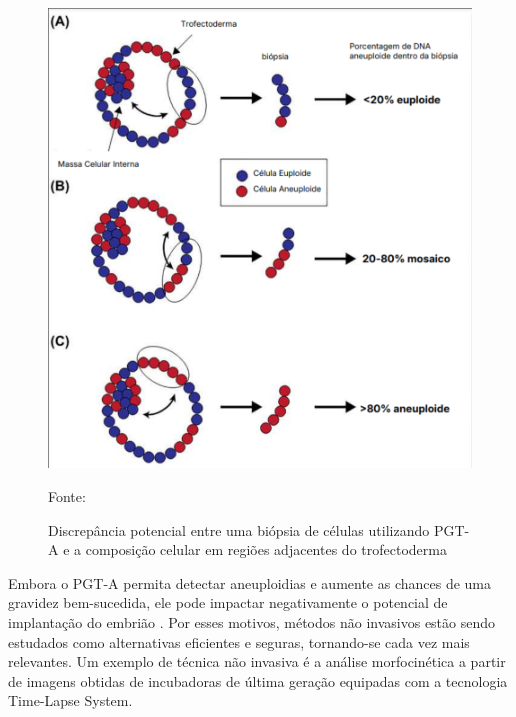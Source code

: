 \begin{figure}[h]
    \captionsetup{font=footnotesize, justification=centering, labelsep=period, position=above}
    \caption{Discrepância potencial entre uma biópsia de células utilizando PGT-A e a composição celular em regiões adjacentes do trofectoderma}
    \label{fig:biopsiaPGT-A}
    \centering
    \includegraphics[scale=0.5]{figuras/biopsiaPGT-A.pdf}
    \vspace{0.3cm} 
    \begin{minipage}{\linewidth}
        \centering
        \scriptsize{Fonte: \cite{gleicher2021}}
    \end{minipage}
\end{figure}
\FloatBarrier

Embora o PGT-A permita detectar aneuploidias e aumente as chances de uma gravidez bem-sucedida, ele pode impactar negativamente o potencial de implantação do embrião \cite{gleicher2021}. Por esses motivos, métodos não invasivos estão sendo estudados como alternativas eficientes e seguras, tornando-se cada vez mais relevantes. Um exemplo de técnica não invasiva é a análise morfocinética a partir de imagens obtidas de incubadoras de última geração equipadas com a tecnologia Time-Lapse System.

